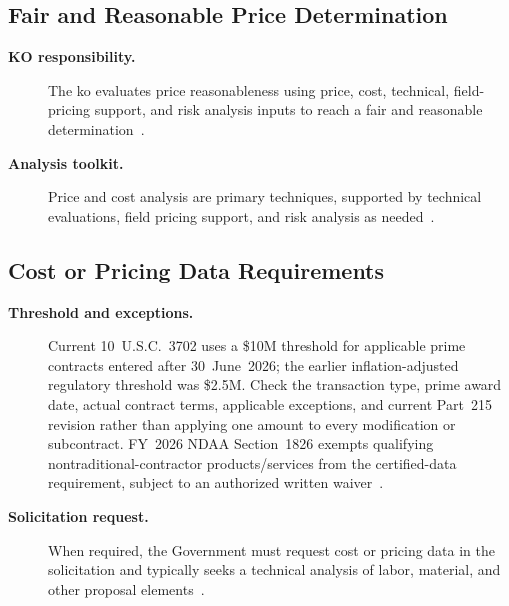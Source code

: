 \documentclass[../main.tex]{subfiles}
\begin{document}
\subsection{Fair and Reasonable Price Determination}
\begin{description}
  \item[\textbf{KO responsibility.}] The \ac{ko} evaluates price reasonableness using price, cost, technical, field-pricing support, and risk analysis inputs to reach a fair and reasonable determination~\autocite{edo-3-2-4-cost-price-evaluation-2025,FAR-15-404-1-Proposal-Analysis}.
  \item[\textbf{Analysis toolkit.}] Price and cost analysis are primary techniques, supported by technical evaluations, field pricing support, and risk analysis as needed~\autocite{edo-3-2-4-cost-price-evaluation-2025,FAR-15-404-1-Proposal-Analysis,FAR-15-404-2-Field-Pricing-Assistance}.
\end{description}

\subsection{Cost or Pricing Data Requirements}
\begin{description}
  \item[\textbf{Threshold and exceptions.}] Current 10~U.S.C.\ 3702 uses a \$10M threshold for applicable prime contracts entered after 30~June~2026; the earlier inflation-adjusted regulatory threshold was \$2.5M. Check the transaction type, prime award date, actual contract terms, applicable exceptions, and current Part~215 revision rather than applying one amount to every modification or subcontract. FY~2026 NDAA Section~1826 exempts qualifying nontraditional-contractor products/services from the certified-data requirement, subject to an authorized written waiver~\autocite{USC-10-3702,USC-10-3014,DFARS-Part215-Deviation-2026,DPCAP-RFO-Index-20261020}.
  \item[\textbf{Solicitation request.}] When required, the Government must request cost or pricing data in the solicitation and typically seeks a technical analysis of labor, material, and other proposal elements~\autocite{edo-3-2-4-cost-price-evaluation-2025}.
\end{description}
\end{document}
